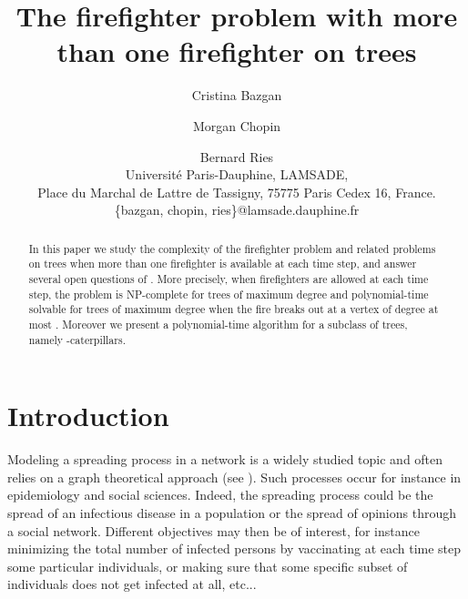 \documentclass[10pt]{article}
\begin{document}
\newcommand\thetitle{The firefighter problem with more than one firefighter on trees}

\title{\textbf{\thetitle}}
\author{Cristina Bazgan \and Morgan Chopin \and Bernard Ries\\
 {\small Universit\'{e} Paris-Dauphine, LAMSADE,}\\
  {\small Place du Marchal de Lattre de Tassigny, 75775 Paris Cedex 16, France.}\\
  {\small \{bazgan, chopin, ries\}@lamsade.dauphine.fr }\\
 }

\date{ }

\maketitle












\begin{abstract}
In this paper we study the complexity of the firefighter
problem and related problems on trees when more than one firefighter is available at each time
step, and answer several open questions of \cite{finbow2009}.
More precisely, when  firefighters are allowed at each time step, the problem is NP-complete
for trees of maximum degree  and polynomial-time solvable for trees of
maximum degree  when the fire breaks out at a vertex of
degree at most . Moreover we present a polynomial-time algorithm for a subclass of trees, namely -caterpillars.
\end{abstract}






\section{Introduction}

Modeling a spreading process in a network is a widely studied topic and often relies on a graph theoretical approach (see \cite{chen2008,dreyer2009,finbow2009,kempe2003,ng2008,scott2006}). Such processes occur for instance in epidemiology and social sciences. Indeed, the spreading process could be the spread of an infectious disease in a population 
or the spread of opinions through a social network. Different objectives may then be of interest, for instance minimizing the total number of 
infected persons by vaccinating at each time step some particular individuals, or making sure that some specific subset of individuals does not get infected at all, etc...
\end{document}

